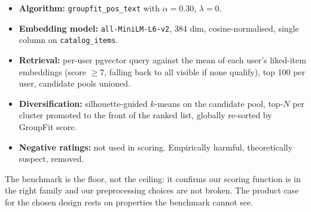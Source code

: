 \documentclass[11pt]{article}
\begin{document}
\begin{itemize}[leftmargin=*]
\item \textbf{Algorithm:} \texttt{groupfit\_pos\_text} with
$\alpha = 0.30$, $\lambda = 0$.
\item \textbf{Embedding model:} \texttt{all-MiniLM-L6-v2}, 384 dim,
cosine-normalised, single column on \texttt{catalog\_items}.
\item \textbf{Retrieval:} per-user pgvector query against the mean of
each user's liked-item embeddings (score $\geq 7$, falling back to all
visible if none qualify), top 100 per user, candidate pools unioned.
\item \textbf{Diversification:} silhouette-guided $k$-means on the
candidate pool, top-$N$ per cluster promoted to the front of the
ranked list, globally re-sorted by GroupFit score.
\item \textbf{Negative ratings:} not used in scoring. Empirically
harmful, theoretically suspect, removed.
\end{itemize}

The benchmark is the floor, not the ceiling: it confirms our scoring
function is in the right family and our preprocessing choices are
not broken. The product case for the chosen design rests on properties
the benchmark cannot see.
\end{document}
